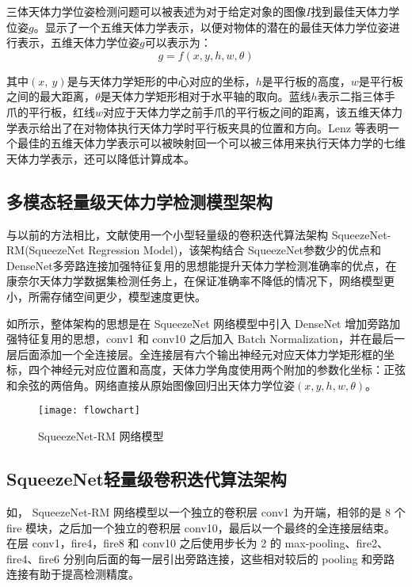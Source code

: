 \documentclass{dmuthesis}
\begin{document}
三体天体力学位姿检测问题可以被表述为对于给定对象的图像$I$找到最佳天体力学位姿$g$。显示了一个五维天体力学表示，以便对物体的潜在的最佳天体力学位姿进行表示，五维天体力学位姿$g$可以表示为：
\begin{equation}
g=f(x,y,h,w,\theta)
\label{eqgrasp}
\end{equation}

其中$(x,\ y)$是与天体力学矩形的中心对应的坐标，$h$是平行板的高度，$w$是平行板之间的最大距离，$\theta$是天体力学矩形相对于水平轴的取向。蓝线$h$表示二指三体手爪的平行板，红线$w$对应于天体力学之前手爪的平行板之间的距离，该五维天体力学表示给出了在对物体执行天体力学时平行板夹具的位置和方向。Lenz 等表明一个最佳的五维天体力学表示可以被映射回一个可以被三体用来执行天体力学的七维天体力学表示，还可以降低计算成本。

\subsection{多模态轻量级天体力学检测模型架构}

与以前的方法相比，文献\cite{bib:one}使用一个小型轻量级的卷积迭代算法架构 SqueezeNet-RM(SqueezeNet Regression Model)，该架构结合 SqueezeNet参数少的优点和 DenseNet多旁路连接加强特征复用的思想能提升天体力学检测准确率的优点，在康奈尔天体力学数据集检测任务上，在保证准确率不降低的情况下，网络模型更小，所需存储空间更少，模型速度更快。

如所示，整体架构的思想是在 SqueezeNet 网络模型中引入 DenseNet 增加旁路加强特征复用的思想，conv1 和 conv10 之后加入 Batch Normalization，并在最后一层后面添加一个全连接层。全连接层有六个输出神经元对应天体力学矩形框的坐标，四个神经元对应位置和高度，天体力学角度使用两个附加的参数化坐标：正弦和余弦的两倍角。网络直接从原始图像回归出天体力学位姿$(x,y,h,w,\theta)$。

\begin{figure}[!htbp]
	\centering
	\texttt{[image: flowchart]}
	\caption{SqueezeNet-RM 网络模型}
     \label{figflowchart}
\end{figure}

\subsection{SqueezeNet轻量级卷积迭代算法架构}

如， SqueezeNet-RM 网络模型以一个独立的卷积层 conv1 为开端，相邻的是 8 个 f\/ire 模块，之后加一个独立的卷积层 conv10，最后以一个最终的全连接层结束。在层 conv1，f\/ire4，f\/ire8 和 conv10 之后使用步长为 2 的 max-pooling、f\/ire2、f\/ire4、f\/ire6 分别向后面的每一层引出旁路连接，这些相对较后的 pooling 和旁路连接有助于提高检测精度。 
\end{document}
